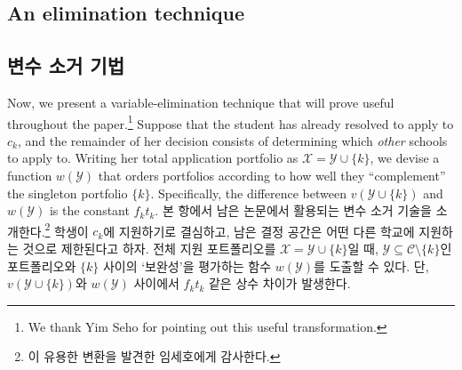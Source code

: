 \documentclass[11pt]{article} %
\theoremstyle{definition}
\theoremstyle{definition}
\begin{document}
\ifen \subsection{An elimination technique} \else \subsection{변수 소거 기법} \fi  \label{eliminationtechniquesection}
\ifen
Now, we present a variable-elimination technique that will prove useful throughout the paper.\footnote{We thank Yim Seho for pointing out this useful transformation.} Suppose that the student has already resolved to apply to $c_k$, and the remainder of her decision consists of determining which \emph{other} schools to apply to. Writing her total application portfolio as $\mathcal{X} = \mathcal{Y} \cup \{k\}$, we devise a function $w(\mathcal{Y})$ that orders portfolios according to how well they ``complement'' the singleton portfolio $\{k\}$. Specifically, the difference between $v(\mathcal{Y} \cup\{k\})$ and $w(\mathcal{Y})$ is the constant $f_k t_k$.
\else
본 항에서 남은 논문에서 활용되는 변수 소거 기술을 소개한다.\footnote{이 유용한 변환을 발견한 임세호에게 감사한다.} 학생이 $c_k$에 지원하기로 결심하고, 남은 결정 공간은 어떤 다른 학교에 지원하는 것으로 제한된다고 하자. 전체 지원 포트폴리오를 $\mathcal{X} = \mathcal{Y} \cup \{k\}$일 때, $\mathcal{Y} \subseteq \mathcal{C} \setminus \{k\}$인 포트폴리오와 $\{k\}$ 사이의 \mbox{`보완성'을} 평가하는 함수 $w(\mathcal{Y})$를 도출할 수 있다. 단, $v(\mathcal{Y} \cup\{k\})$와 $w(\mathcal{Y})$ 사이에서 $f_k t_k$ 같은 상수 차이가 발생한다.
\fi 
\end{document}
